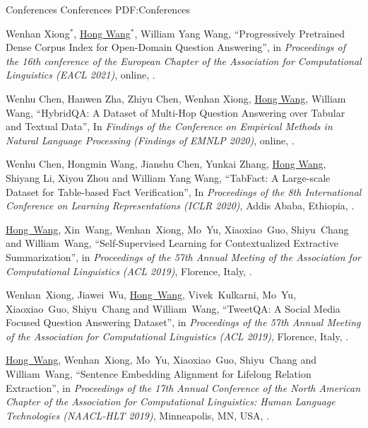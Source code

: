 \documentclass[letterpaper,MMMyyyy,nonstopmode]{simpleresumecv}
\begin{document}
\begin{Body}

\BigGap
\SubSection
{Conferences}
{Conferences}
{PDF:Conferences}

\begin{enumerate}[label={[\arabic*]~~}]
\item
Wenhan Xiong$^*$, \underline{Hong Wang}$^*$, William Yang Wang,
``Progressively Pretrained Dense Corpus Index for Open-Domain Question Answering'',
in \textit{Proceedings of the 16th conference of the European Chapter of the Association for Computational Linguistics (EACL 2021)}, online, 
.

\item
Wenhu Chen, Hanwen Zha, Zhiyu Chen, Wenhan Xiong, \underline{Hong Wang}, William Wang,
``HybridQA: A Dataset of Multi-Hop Question Answering over Tabular and Textual Data'',
In \textit{Findings of the Conference on Empirical Methods in Natural Language Processing (Findings of EMNLP 2020)}, online, 
.

\item
Wenhu Chen, Hongmin Wang, Jianshu Chen, Yunkai Zhang, \underline{Hong Wang}, Shiyang Li, Xiyou Zhou and William Yang Wang,
``TabFact: A Large-scale Dataset for Table-based Fact Verification'',
In \textit{Proceedings of the 8th International Conference on Learning Representations (ICLR 2020)}, Addis Ababa, Ethiopia,
.

\item
\underline{Hong~Wang}, Xin~Wang, Wenhan~Xiong, Mo~Yu, Xiaoxiao~Guo, Shiyu~Chang and William~Wang,
``Self-Supervised Learning for Contextualized Extractive Summarization'',
in \textit{Proceedings of the 57th Annual Meeting of the Association for Computational Linguistics (ACL 2019)},
Florence, Italy,
.

\item
Wenhan~Xiong, Jiawei~Wu, \underline{Hong~Wang}, Vivek~Kulkarni, Mo~Yu, Xiaoxiao~Guo, Shiyu~Chang and William~Wang,
``TweetQA: A Social Media Focused Question Answering Dataset'',
in \textit{Proceedings of the 57th Annual Meeting of the Association for Computational Linguistics (ACL 2019)},
Florence, Italy,
.

\item
\underline{Hong~Wang}, Wenhan~Xiong, Mo~Yu, Xiaoxiao~Guo, Shiyu~Chang and William~Wang,
``Sentence Embedding Alignment for Lifelong Relation Extraction'',
in \textit{Proceedings of the 17th Annual Conference of the North American Chapter of the Association for Computational Linguistics: Human Language Technologies (NAACL-HLT 2019)},
Minneapolis, MN, USA,
.


\end{enumerate}
\end{Body}
\end{document}
